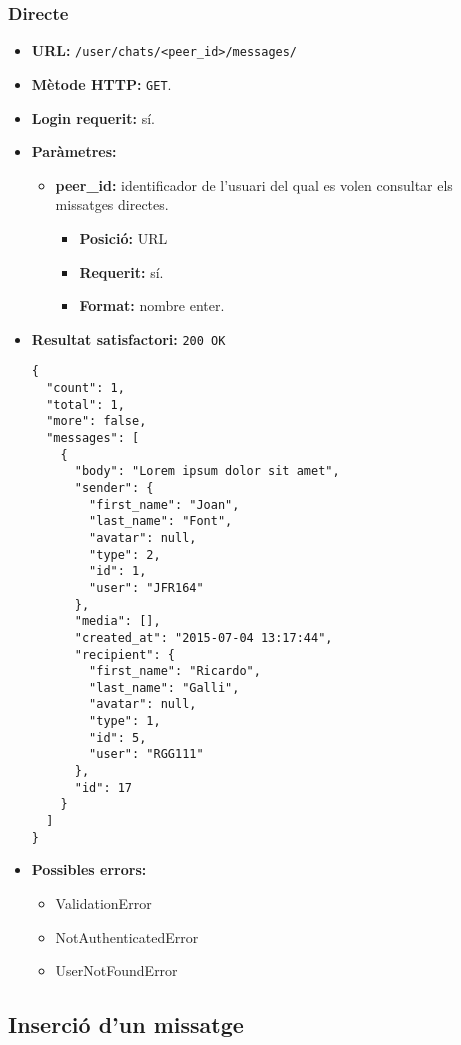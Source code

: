 	\subsubsection{Directe}
	\begin{itemize}
	\item \textbf{\ac{URL}:} \texttt{/user/chats/<peer\_id>/messages/}
	\item \textbf{Mètode \ac{HTTP}: } \texttt{GET}.
	\item \textbf{Login requerit:} sí.
	\item \textbf{Paràmetres:}
	\begin{itemize}
		\item \textbf{peer\_id:} identificador de l'usuari del qual es volen consultar els missatges directes.
		\begin{itemize}
			\item \textbf{Posició:} \ac{URL}
			\item \textbf{Requerit:} sí.
			\item \textbf{Format:} nombre enter.
		\end{itemize}
	\end{itemize}
		\item \textbf{Resultat satisfactori:} \texttt{200 OK}
	\begin{verbatim}
{
  "count": 1,
  "total": 1,
  "more": false,
  "messages": [
    {
      "body": "Lorem ipsum dolor sit amet",
      "sender": {
        "first_name": "Joan",
        "last_name": "Font",
        "avatar": null,
        "type": 2,
        "id": 1,
        "user": "JFR164"
      },
      "media": [],
      "created_at": "2015-07-04 13:17:44",
      "recipient": {
        "first_name": "Ricardo",
        "last_name": "Galli",
        "avatar": null,
        "type": 1,
        "id": 5,
        "user": "RGG111"
      },
      "id": 17
    }
  ]
}
	\end{verbatim}
	\item \textbf{Possibles errors:}
	\begin{itemize}
		\item ValidationError
		\item NotAuthenticatedError
		\item UserNotFoundError
	\end{itemize}
	\end{itemize}


\subsection{Inserció d'un missatge}

